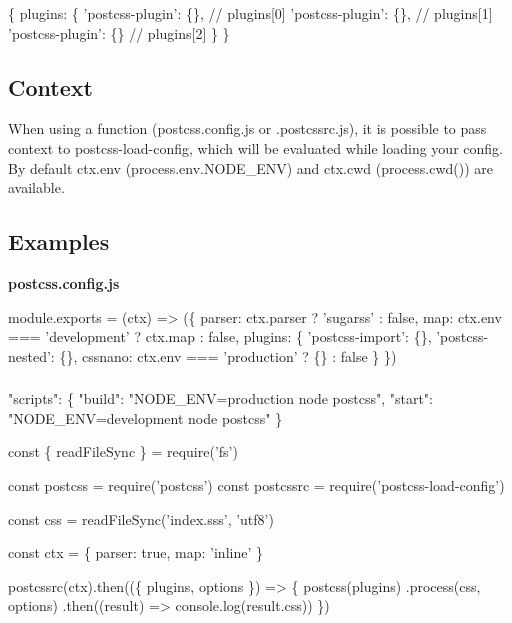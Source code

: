 \begin{DoxyCode}
\{
  plugins: \{
    'postcss-plugin': \{\}, // plugins[0]
    'postcss-plugin': \{\}, // plugins[1]
    'postcss-plugin': \{\}  // plugins[2]
  \}
\}
\end{DoxyCode}


\subsection*{Context}

When using a function ({\ttfamily postcss.\+config.\+js} or {\ttfamily .postcssrc.\+js}), it is possible to pass context to {\ttfamily postcss-\/load-\/config}, which will be evaluated while loading your config. By default {\ttfamily ctx.\+env (process.\+env.\+N\+O\+D\+E\+\_\+\+E\+NV)} and {\ttfamily ctx.\+cwd (process.\+cwd())} are available.

\subsection*{Examples}

{\bfseries postcss.\+config.\+js}


\begin{DoxyCode}
module.exports = (ctx) => (\{
  parser: ctx.parser ? 'sugarss' : false,
  map: ctx.env === 'development' ? ctx.map : false,
  plugins: \{
    'postcss-import': \{\},
    'postcss-nested': \{\},
    cssnano: ctx.env === 'production' ? \{\} : false
  \}
\})
\end{DoxyCode}


\subsubsection*{}


\begin{DoxyCode}
"scripts": \{
  "build": "NODE\_ENV=production node postcss",
  "start": "NODE\_ENV=development node postcss"
\}
\end{DoxyCode}



\begin{DoxyCode}
const \{ readFileSync \} = require('fs')

const postcss = require('postcss')
const postcssrc = require('postcss-load-config')

const css = readFileSync('index.sss', 'utf8')

const ctx = \{ parser: true, map: 'inline' \}

postcssrc(ctx).then((\{ plugins, options \}) => \{
  postcss(plugins)
    .process(css, options)
    .then((result) => console.log(result.css))
\})
\end{DoxyCode}


